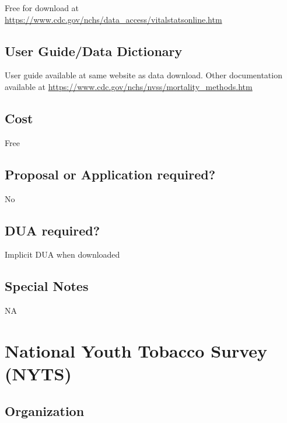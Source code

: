 \documentclass[
]{book}
\begin{document}
Free for download at \url{https://www.cdc.gov/nchs/data_access/vitalstatsonline.htm}

\hypertarget{user-guidedata-dictionary-66}{%
\section{User Guide/Data Dictionary}\label{user-guidedata-dictionary-66}}

User guide available at same website as data download. Other documentation available at \url{https://www.cdc.gov/nchs/nvss/mortality_methods.htm}

\hypertarget{cost-66}{%
\section{Cost}\label{cost-66}}

Free

\hypertarget{proposal-or-application-required-66}{%
\section{Proposal or Application required?}\label{proposal-or-application-required-66}}

No

\hypertarget{dua-required-66}{%
\section{DUA required?}\label{dua-required-66}}

Implicit DUA when downloaded

\hypertarget{special-notes-66}{%
\section{Special Notes}\label{special-notes-66}}

NA

\mainmatter

\hypertarget{national-youth-tobacco-survey-nyts}{%
\chapter{National Youth Tobacco Survey (NYTS)}\label{national-youth-tobacco-survey-nyts}}

\hypertarget{organization-67}{%
\section{Organization}\label{organization-67}}
\end{document}
